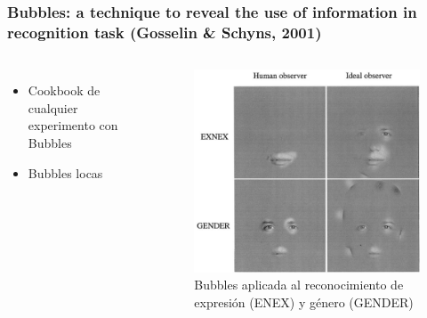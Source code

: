 \documentclass{beamer}
\begin{document}
\begin{frame}
 \frametitle{Bubbles: a technique to reveal the use of information in recognition task (Gosselin \& Schyns, 2001)}
 \begin{columns}[t]
   
    \begin{itemize}
    \item Cookbook de cualquier experimento con Bubbles
    \item Bubbles locas
    \end{itemize}
  
   \begin{figure}
   \includegraphics[width=\textwidth]{graficos/gosselin2.png}
\caption{Bubbles aplicada al reconocimiento de expresión (ENEX) y género (GENDER)}
   \end{figure}
  \end{columns}
\end{frame}
\end{document}
